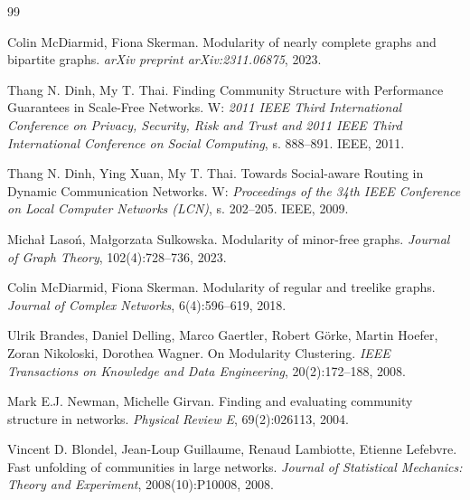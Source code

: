 \documentclass[letterpaper,12pt]{article}
\begin{document}

\begin{thebibliography}{99}

  Colin McDiarmid, Fiona Skerman.
  \newblock Modularity of nearly complete graphs and bipartite graphs.
  \newblock \emph{arXiv preprint arXiv:2311.06875}, 2023.

  Thang N. Dinh, My T. Thai.
  \newblock Finding Community Structure with Performance Guarantees in Scale-Free Networks.
  \newblock W: \emph{2011 IEEE Third International Conference on Privacy, Security, Risk and Trust and 2011 IEEE Third International Conference on Social Computing}, s. 888--891. IEEE, 2011.

  Thang N. Dinh, Ying Xuan, My T. Thai.
  \newblock Towards Social-aware Routing in Dynamic Communication Networks.
  \newblock W: \emph{Proceedings of the 34th IEEE Conference on Local Computer Networks (LCN)}, s. 202--205. IEEE, 2009.

  Michał Lasoń, Małgorzata Sulkowska.
  \newblock Modularity of minor-free graphs.
  \newblock \emph{Journal of Graph Theory}, 102(4):728--736, 2023.

  Colin McDiarmid, Fiona Skerman.
  \newblock Modularity of regular and treelike graphs.
  \newblock \emph{Journal of Complex Networks}, 6(4):596--619, 2018.

  Ulrik Brandes, Daniel Delling, Marco Gaertler, Robert Görke, Martin Hoefer, Zoran Nikoloski, Dorothea Wagner.
  \newblock On Modularity Clustering.
  \newblock \emph{IEEE Transactions on Knowledge and Data Engineering}, 20(2):172--188, 2008.

  Mark E.J. Newman, Michelle Girvan.
  \newblock Finding and evaluating community structure in networks.
  \newblock \emph{Physical Review E}, 69(2):026113, 2004.

  Vincent D. Blondel, Jean-Loup Guillaume, Renaud Lambiotte, Etienne Lefebvre.
  \newblock Fast unfolding of communities in large networks.
  \newblock \emph{Journal of Statistical Mechanics: Theory and Experiment}, 2008(10):P10008, 2008.


\end{thebibliography}
\end{document}
